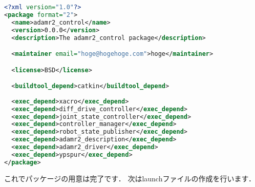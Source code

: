 \documentclass[{../../master}]{subfiles}
\begin{document}
\begin{lstlisting}[language=XML, label=code:adamr2_control_package_xml, caption=\textsf{package.xml} in \textsf{adamr2\_control}]
<?xml version="1.0"?>
<package format="2">
  <name>adamr2_control</name>
  <version>0.0.0</version>
  <description>The adamr2_control package</description>

  <maintainer email="hoge@hogehoge.com">hoge</maintainer>

  <license>BSD</license>

  <buildtool_depend>catkin</buildtool_depend>
  
  <exec_depend>xacro</exec_depend>
  <exec_depend>diff_drive_controller</exec_depend>
  <exec_depend>joint_state_controller</exec_depend>
  <exec_depend>controller_manager</exec_depend>
  <exec_depend>robot_state_publisher</exec_depend>
  <exec_depend>adamr2_description</exec_depend>
  <exec_depend>adamr2_driver</exec_depend>
  <exec_depend>ypspur</exec_depend>
</package>
\end{lstlisting}

これでパッケージの用意は完了です．
次はlaunchファイルの作成を行います．
\end{document}
